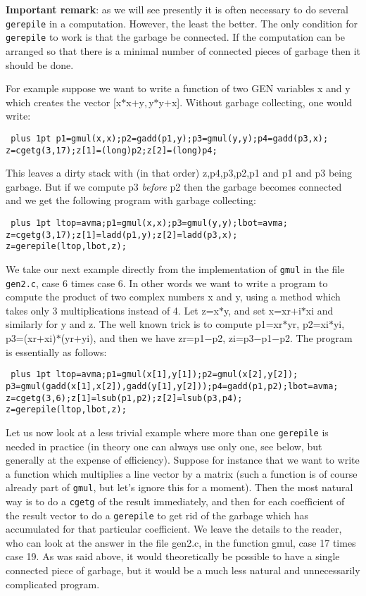 {\bf Important remark}: as we will see presently it is often necessary
to do several {\tt gerepile} in a computation. However, the least the better.
The only condition for {\tt gerepile} to work is that the garbage be connected.
If the computation can be arranged so that there is a minimal number of
connected pieces of garbage then it should be done.

For example suppose we want to write a function of two GEN variables x and y
which creates the vector [x$*$x$+$y$,$y$*$y$+$x]. Without garbage collecting,
one would write:

{\tt \obeylines\parskip=0pt plus 1pt
\hbox{}
p1=gmul(x,x);p2=gadd(p1,y);p3=gmul(y,y);p4=gadd(p3,x);
z=cgetg(3,17);z[1]=(long)p2;z[2]=(long)p4;}

This leaves a dirty stack with (in that order) z,p4,p3,p2,p1 and p1 and p3
being garbage. But if we compute p3 {\it before \/} p2 then the garbage
becomes connected and we get the following program with garbage collecting:

{\tt \obeylines\parskip=0pt plus 1pt
\hbox{}
ltop=avma;p1=gmul(x,x);p3=gmul(y,y);lbot=avma;
z=cgetg(3,17);z[1]=ladd(p1,y);z[2]=ladd(p3,x);
z=gerepile(ltop,lbot,z);}

We take our next example directly from the implementation of {\tt gmul} in the
file {\tt gen2.c}, case 6 times case 6. In other words
we want to write a program to compute the product of two complex numbers
x and y, using a method which takes only 3 multiplications instead
of 4. Let z=x$*$y, and set x=xr$+$i$*$xi and similarly for y and z. The well known
trick is to compute p1=xr$*$yr, p2=xi$*$yi, p3=(xr$+$xi)$*$(yr$+$yi), and then we
have zr=p1$-$p2, zi=p3$-$p1$-$p2. The program is essentially as follows:

{\tt \obeylines\parskip=0pt plus 1pt
\hbox{}
ltop=avma;p1=gmul(x[1],y[1]);p2=gmul(x[2],y[2]);
p3=gmul(gadd(x[1],x[2]),gadd(y[1],y[2]));p4=gadd(p1,p2);lbot=avma;
z=cgetg(3,6);z[1]=lsub(p1,p2);z[2]=lsub(p3,p4);
z=gerepile(ltop,lbot,z);}

Let us now look at a less trivial example where more than one {\tt gerepile} is
needed in practice (in theory one can always use only one, see below, but
generally at the expense of efficiency). Suppose for instance that we want
to write a function which multiplies a line vector by a matrix (such a
function is of course already part of {\tt gmul}, but let's ignore this for a
moment). Then the most natural way is to do a {\tt cgetg} of the result
immediately, and then for each coefficient of the result vector to do
a {\tt gerepile} to get rid of the garbage which has accumulated for that
particular coefficient. We leave the details to the reader, who can
look at the answer in the file gen2.c, in the function gmul, case 17 times
case 19. As was said above, it would theoretically be possible to have
a single connected piece of garbage, but it would be a much less natural
and unnecessarily complicated program.

